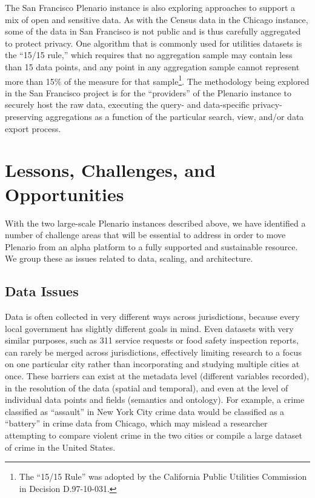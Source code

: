 \documentclass[11pt]{article}
\begin{document}
The San Francisco Plenario instance is also exploring approaches to support a mix of open and sensitive data. As with the Census data in the Chicago instance, some of the data in San Francisco is not public and is thus carefully aggregated to protect privacy. One algorithm that is commonly used for utilities datasets is the ``15/15 rule,'' which requires that no aggregation sample may contain less than 15 data points, and any point in any aggregation sample cannot represent more than 15\% of the measure for that sample\footnote{The ``15/15 Rule'' was adopted by the California Public Utilities Commission in Decision D.97-10-031.}. The methodology being explored in the San Francisco project is for the ``providers'' of the Plenario instance to securely host the raw data, executing the query- and data-specific privacy-preserving aggregations as a function of the particular search, view, and/or data export process.




\section{Lessons, Challenges, and Opportunities}\label{sec:challenges}
With the two large-scale Plenario instances described above, we have identified a number of challenge areas that will be essential to address in order to move Plenario from an alpha platform to a fully supported and sustainable resource. We group these as issues related to data, scaling, and architecture. 

\subsection{\textbf{Data Issues}}
Data is often collected in very different ways across jurisdictions, because every local government has slightly different goals in mind. Even datasets with very similar purposes, such as 311 service requests or food safety inspection reports, can rarely be merged across jurisdictions, effectively limiting research to a focus on one particular city rather than incorporating and studying multiple cities at once. These barriers can exist at the metadata level (different variables recorded), in the resolution of the data (spatial and temporal), and even at the level of individual data points and fields (semantics and ontology). For example, a crime classified as ``assault'' in New York City crime data would be classified as a ``battery'' in crime data from Chicago, which may mislead a researcher attempting to compare violent crime in the two cities or compile a large dataset of crime in the United States. 
\end{document}
